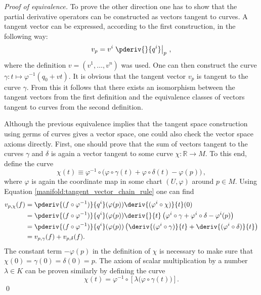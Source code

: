{\begin{mdframed}[roundcorner=10pt, linecolor=blue, linewidth=1pt]
\begin{proof}[Proof of equivalence]
                To prove the other direction one has to show that the partial derivative operators can be constructed as vectors tangent to curves. A tangent vector can be expressed, according to the first construction, in the following way: \[v_p = v^i\left.\pderiv{}{q^i}\right|_p\,,\] where the definition $v = (v^1,\ldots,v^n)$ was used. One can then construct the curve $\gamma:t\mapsto\varphi^{-1}(q_0+vt)$. It is obvious that the tangent vector $v_p$ is tangent to the curve $\gamma$. From this it follows that there exists an isomorphism between the tangent vectors from the first definition and the equivalence classes of vectors tangent to curves from the second definition.

                Although the previous equivalence implies that the tangent space construction using germs of curves gives a vector space, one could also check the vector space axioms directly. First, one should prove that the sum of vectors tangent to the curves $\gamma$ and $\delta$ is again a vector tangent to some curve $\chi:\mathbb{R}\rightarrow M$. To this end, define the curve \[\chi(t)\equiv\varphi^{-1}\circ\Big(\varphi\circ\gamma(t) + \varphi\circ\delta(t) - \varphi(p)\Big)\,,\] where $\varphi$ is again the coordinate map in some chart $(U,\varphi)$ around $p\in M$. Using Equation \eqref{manifold:tangent_vector_chain_rule} one can find
                \begin{align*}
                    v_{p,\chi}(f) &= \pderiv{(f\circ\varphi^{-1})}{q^i}(\varphi(p))\deriv{(\varphi^i\circ\chi)}{t}(0)\\
                    &=\pderiv{(f\circ\varphi^{-1})}{q^i}(\varphi(p))\deriv{}{t}\left(\varphi^i\circ\gamma + \varphi^i\circ\delta - \varphi^i(p)\right)\\
                    &=\pderiv{(f\circ\varphi^{-1})}{q^i}(\varphi(p))\left(\deriv{(\varphi^i\circ\gamma)}{t} + \deriv{(\varphi^i\circ\delta)}{t}\right)\\
                    &=v_{p,\gamma}(f) + v_{p,\delta}(f).
                \end{align*}
                The constant term $-\varphi(p)$ in the definition of $\chi$ is necessary to make sure that $\chi(0) = \gamma(0) = \delta(0) = p$. The axiom of scalar multiplication by a number $\lambda\in K$ can be proven similarly by defining the curve \[\chi(t) = \varphi^{-1}\circ\left[\lambda\Big(\varphi\circ\gamma(t)\Big)\right].\]\qed
            \end{proof}
        \end{mdframed}
    }


